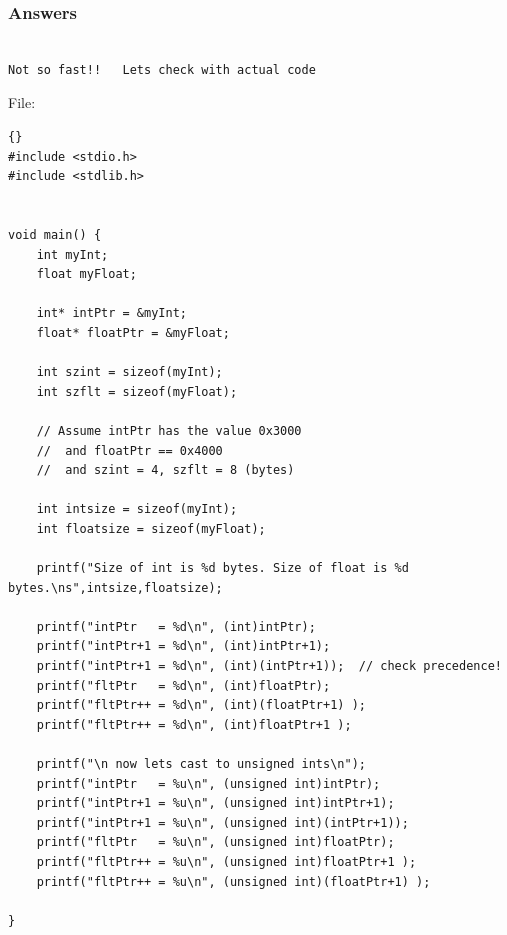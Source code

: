 \documentclass{article}	%
\begin{document}



\subsubsection*{Answers}	%
\begin{verbatim}

Not so fast!!   Lets check with actual code

\end{verbatim}





File: 


\lstset{language=c}
\lstset{basicstyle=\ttfamily, commentstyle=\textit}
\begin{lstlisting}[frame=trbl]{} 
#include <stdio.h>
#include <stdlib.h>


void main() {
    int myInt;
    float myFloat;

    int* intPtr = &myInt;
    float* floatPtr = &myFloat;

    int szint = sizeof(myInt);
    int szflt = sizeof(myFloat);

    // Assume intPtr has the value 0x3000
    //  and floatPtr == 0x4000
    //  and szint = 4, szflt = 8 (bytes)
    
    int intsize = sizeof(myInt);
    int floatsize = sizeof(myFloat);
    
    printf("Size of int is %d bytes. Size of float is %d bytes.\ns",intsize,floatsize);

    printf("intPtr   = %d\n", (int)intPtr);
    printf("intPtr+1 = %d\n", (int)intPtr+1);
    printf("intPtr+1 = %d\n", (int)(intPtr+1));  // check precedence!
    printf("fltPtr   = %d\n", (int)floatPtr);
    printf("fltPtr++ = %d\n", (int)(floatPtr+1) );
    printf("fltPtr++ = %d\n", (int)floatPtr+1 );
    
    printf("\n now lets cast to unsigned ints\n");
    printf("intPtr   = %u\n", (unsigned int)intPtr);
    printf("intPtr+1 = %u\n", (unsigned int)intPtr+1);
    printf("intPtr+1 = %u\n", (unsigned int)(intPtr+1));
    printf("fltPtr   = %u\n", (unsigned int)floatPtr);
    printf("fltPtr++ = %u\n", (unsigned int)floatPtr+1 );
    printf("fltPtr++ = %u\n", (unsigned int)(floatPtr+1) );

}
\end{lstlisting}

\end{document}
